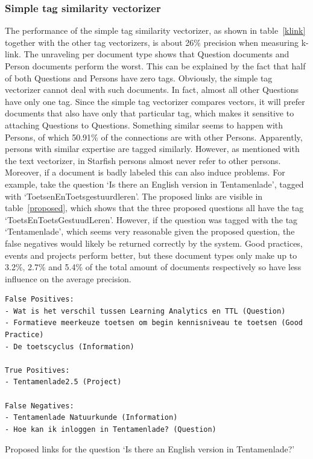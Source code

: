 \subsubsection{Simple tag similarity vectorizer} 
The performance of the simple tag similarity vectorizer, as shown in
table~\ref{klink} together with the other tag vectorizers, is about 26\%
precision when measuring k-link. The unraveling per document type shows that
Question documents and Person documents perform the worst. This can be
explained by the fact that half of both Questions and Persons have zero tags.
Obviously, the simple tag vectorizer cannot deal with such documents. In fact,
almost all other Questions have only one tag. Since the simple tag vectorizer
compares vectors, it will prefer documents that also have only that particular
tag, which makes it sensitive to attaching Questions to Questions. Something
similar seems to happen with Persons, of which 50.91\% of the connections are
with other Persons.  Apparently, persons with similar expertise are tagged
similarly.  However, as mentioned with the text vectorizer, in Starfish persons
almost never refer to other persons. 
Moreover, if a document is badly labeled
this can also induce problems. For example, take the question `Is there an
English version in Tentamenlade', tagged with `ToetsenEnToetsgestuurdleren'.
The proposed links are visible in table~\ref{proposed}, which shows that  the
three proposed questions all have the tag `ToetsEnToetsGestuudLeren'. However,
if the question was tagged with the tag `Tentamenlade', which seems very
reasonable given the proposed question, the false negatives would likely be
returned correctly by the system. Good practices, events and projects perform
better, but these document types only make up to 3.2\%, 2.7\% and 5.4\% of the
total amount of documents respectively so have less influence on the average
precision.

\begin{table}
\begin{lstlisting}
False Positives:
- Wat is het verschil tussen Learning Analytics en TTL (Question)
- Formatieve meerkeuze toetsen om begin kennisniveau te toetsen (Good Practice)
- De toetscyclus (Information)

True Positives:
- Tentamenlade2.5 (Project)

False Negatives:
- Tentamenlade Natuurkunde (Information)
- Hoe kan ik inloggen in Tentamenlade? (Question)
\end{lstlisting}
\caption{Proposed links for the question `Is there an English version in Tentamenlade?'}
\label{proposed}
\end{table}

